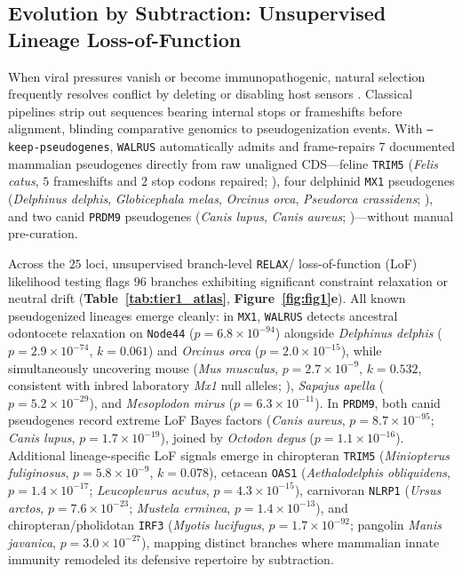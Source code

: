 \documentclass[11pt,letterpaper]{article}
\newcommand{\WALRUS}{\texttt{WALRUS}\xspace}
\newcommand{\RELAX}{\texttt{RELAX}\xspace}
\begin{document}
\subsection{Evolution by Subtraction: Unsupervised Lineage Loss-of-Function}

When viral pressures vanish or become immunopathogenic, natural selection frequently resolves conflict by deleting or disabling host sensors \citep{mcewan2009truncated,braun2015loss,munoz2011orphan}. Classical pipelines strip out sequences bearing internal stops or frameshifts before alignment, blinding comparative genomics to pseudogenization events. With \texttt{--keep-pseudogenes}, \WALRUS automatically admits and frame-repairs $7$ documented mammalian pseudogenes directly from raw unaligned CDS---feline \texttt{TRIM5} (\textit{Felis catus}, $5$ frameshifts and $2$ stop codons repaired; \citealp{mcewan2009truncated}), four delphinid \texttt{MX1} pseudogenes (\textit{Delphinus delphis}, \textit{Globicephala melas}, \textit{Orcinus orca}, \textit{Pseudorca crassidens}; \citealp{braun2015loss}), and two canid \texttt{PRDM9} pseudogenes (\textit{Canis lupus}, \textit{Canis aureus}; \citealp{munoz2011orphan})---without manual pre-curation.

Across the $25$ loci, unsupervised branch-level \RELAX / loss-of-function (LoF) likelihood testing flags $96$ branches exhibiting significant constraint relaxation or neutral drift (\textbf{Table~\ref{tab:tier1_atlas}}, \textbf{Figure~\ref{fig:fig1}e}). All known pseudogenized lineages emerge cleanly: in \texttt{MX1}, \WALRUS detects ancestral odontocete relaxation on \texttt{Node44} ($p = 6.8 \times 10^{-94}$) alongside \textit{Delphinus delphis} ($p = 2.9 \times 10^{-74}$, $k = 0.061$) and \textit{Orcinus orca} ($p = 2.0 \times 10^{-15}$), while simultaneously uncovering mouse (\textit{Mus musculus}, $p = 2.7 \times 10^{-9}$, $k = 0.532$, consistent with inbred laboratory \textit{Mx1} null alleles; \citealp{staeheli1986mx}), \textit{Sapajus apella} ($p = 5.2 \times 10^{-29}$), and \textit{Mesoplodon mirus} ($p = 6.3 \times 10^{-11}$). In \texttt{PRDM9}, both canid pseudogenes record extreme LoF Bayes factors (\textit{Canis aureus}, $p = 8.7 \times 10^{-95}$; \textit{Canis lupus}, $p = 1.7 \times 10^{-19}$), joined by \textit{Octodon degus} ($p = 1.1 \times 10^{-16}$). Additional lineage-specific LoF signals emerge in chiropteran \texttt{TRIM5} (\textit{Miniopterus fuliginosus}, $p = 5.8 \times 10^{-9}$, $k = 0.078$), cetacean \texttt{OAS1} (\textit{Aethalodelphis obliquidens}, $p = 1.4 \times 10^{-17}$; \textit{Leucopleurus acutus}, $p = 4.3 \times 10^{-15}$), carnivoran \texttt{NLRP1} (\textit{Ursus arctos}, $p = 7.6 \times 10^{-23}$; \textit{Mustela erminea}, $p = 1.4 \times 10^{-13}$), and chiropteran/pholidotan \texttt{IRF3} (\textit{Myotis lucifugus}, $p = 1.7 \times 10^{-92}$; pangolin \textit{Manis javanica}, $p = 3.0 \times 10^{-27}$), mapping distinct branches where mammalian innate immunity remodeled its defensive repertoire by subtraction.
\end{document}
